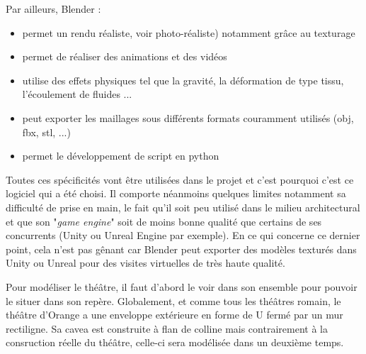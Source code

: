 Par ailleurs, Blender : 
\begin{itemize}
	\item permet un rendu réaliste, voir photo-réaliste) notamment grâce au texturage
	\item permet de réaliser des animations et des vidéos
	\item utilise des effets physiques tel que la gravité, la déformation de type tissu, l'écoulement de fluides ...
	\item peut exporter les maillages sous différents formats couramment utilisés (obj, fbx, stl, ...)
	\item permet le développement de script en python
\end{itemize}

Toutes ces spécificités vont être utilisées dans le projet et c'est pourquoi c'est ce logiciel qui a été choisi. Il comporte néanmoins quelques limites notamment sa difficulté de prise en main, le fait qu'il soit peu utilisé dans le milieu architectural et que son "\textit{game engine}" soit de moins bonne qualité que certains de ses concurrents (Unity ou Unreal Engine par exemple). En ce qui concerne ce dernier point, cela n'est pas gênant car Blender peut exporter des modèles texturés dans Unity ou Unreal pour des visites virtuelles de très haute qualité.

Pour modéliser le théâtre, il faut d'abord le voir dans son ensemble pour pouvoir le situer dans son repère. Globalement, et comme tous les théâtres romain, le théâtre d'Orange a une enveloppe extérieure en forme de U fermé par un mur rectiligne. Sa cavea est construite à flan de colline mais contrairement à la consruction réelle du théâtre, celle-ci sera modélisée dans un deuxième temps. 

